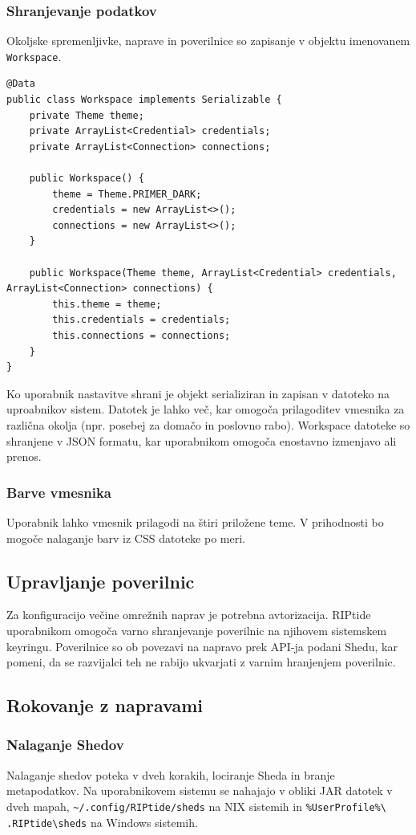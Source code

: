 \documentclass[12pt]{article}
\begin{document}
\subsubsection{Shranjevanje podatkov}
Okoljske spremenljivke, naprave in poverilnice so zapisanje v objektu
imenovanem \texttt{Workspace}.

\begin{lstlisting}
@Data
public class Workspace implements Serializable {
	private Theme theme;
	private ArrayList<Credential> credentials;
	private ArrayList<Connection> connections;

	public Workspace() {
		theme = Theme.PRIMER_DARK;
		credentials = new ArrayList<>();
		connections = new ArrayList<>();
	}

	public Workspace(Theme theme, ArrayList<Credential> credentials, ArrayList<Connection> connections) {
		this.theme = theme;
		this.credentials = credentials;
		this.connections = connections;
	}
}
\end{lstlisting}
Ko uporabnik nastavitve shrani je objekt serializiran in zapisan v datoteko
na uproabnikov sistem. Datotek je lahko več, kar omogoča prilagoditev
vmesnika za različna okolja (npr. posebej za domačo in poslovno rabo).
Workspace datoteke so shranjene v JSON formatu, kar uporabnikom omogoča
enostavno izmenjavo ali prenos.

\subsubsection{Barve vmesnika}
Uporabnik lahko vmesnik prilagodi na štiri priložene teme. V prihodnosti
bo mogoče nalaganje barv iz CSS datoteke po meri.

\subsection{Upravljanje poverilnic}
Za konfiguracijo večine omrežnih naprav je potrebna avtorizacija.
RIPtide uporabnikom omogoča varno shranjevanje poverilnic na njihovem
sistemskem keyringu. Poverilnice so ob povezavi na napravo prek API-ja
podani Shedu, kar pomeni, da se razvijalci teh ne rabijo ukvarjati z
varnim hranjenjem poverilnic.

\subsection{Rokovanje z napravami}
\subsubsection{Nalaganje Shedov}
Nalaganje shedov poteka v dveh korakih, lociranje Sheda in branje
metapodatkov. Na uporabnikovem sistemu se nahajajo v obliki JAR datotek v
dveh mapah, \texttt{\textasciitilde/.config/RIPtide/sheds} na NIX sistemih
in \texttt{\%UserProfile\%\textbackslash\\.RIPtide\textbackslash sheds} na
Windows sistemih.
\end{document}
